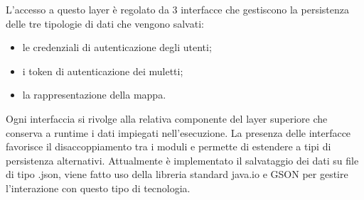 L'accesso a questo layer è regolato da 3 interfacce che gestiscono la persistenza delle tre tipologie di dati che vengono salvati: 
\begin{itemize}
	\item le credenziali di autenticazione degli utenti;
	\item i token di autenticazione dei muletti;
	\item la rappresentazione della mappa.
\end{itemize}

Ogni interfaccia si rivolge alla relativa componente del layer superiore che conserva a runtime i dati impiegati nell'esecuzione. La presenza delle interfacce favorisce il disaccoppiamento tra i moduli e permette di estendere a tipi di persistenza alternativi. Attualmente è implementato il salvataggio dei dati su file di tipo .json, viene fatto uso della libreria standard java.io e GSON per gestire l'interazione con questo tipo di tecnologia.


\pagebreak
